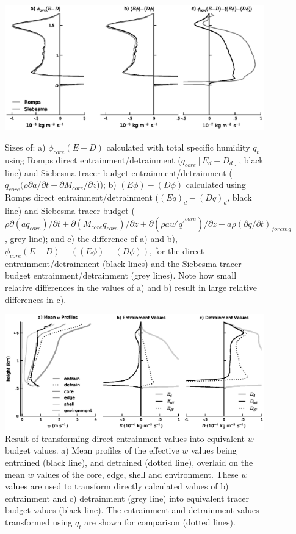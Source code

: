 \documentclass[12pt]{article}
\begin{document}
\begin{figure}[t]
  \noindent\includegraphics[width=39pc]{./figures/numerical_error}\\
  \caption{Sizes of: a) $\phi_{core}(E-D)$ calculated with total 
  specific humidity $q_t$ using Romps direct entrainment/detrainment 
  ($q_{core}[E_d - D_d]$, black line) and Siebesma tracer budget 
  entrainment/detrainment ($q_{core} (\rho {\partial a}/{\partial t} 
  + {\partial M_{core}}/{\partial z}$)); b) $(E\phi)-(D\phi)$ 
  calculated using Romps direct entrainment/detrainment 
  ($(Eq)_d - (Dq)_d$, black line) and Siebesma tracer budget (
  $\rho {\partial (a q_{core})}/{\partial t}
  + {\partial (M_{core} q_{core})}/{\partial z}
  + {\partial (\rho a \overline{w' q'}^{core})}/{\partial z}
  - a \rho ({\partial \bar{q}}/{\partial t})_{forcing}$, 
  grey line); and c) the difference of a) and b), 
  $\phi_{core}(E-D) - ((E\phi)-(D\phi))$, for the direct 
  entrainment/detrainment (black lines) and the Siebesma tracer budget 
  entrainment/detrainment (grey lines).  Note how small relative 
  differences in the values of a) and b) result in large relative 
  differences in c).}
  \label{fig:numerical_error}
\end{figure}

\begin{figure}[t]
  \noindent\includegraphics[width=39pc]{./figures/reynolds_correction_w}
  \caption{Result of transforming direct entrainment values into equivalent 
  $w$ budget values.  a) Mean profiles of the effective $w$ values being
  entrained (black line), and detrained (dotted line), overlaid on the mean 
  $w$ values of the core, edge, shell and environment.  These $w$ values are
  used to transform directly calculated values of b) entrainment and 
  c) detrainment (grey line) into equivalent tracer budget values (black 
  line).  The entrainment and detrainment values transformed using $q_t$ 
  are shown for comparison (dotted lines).}
  \label{fig:Reynolds_correction_w}
\end{figure}
\end{document}
